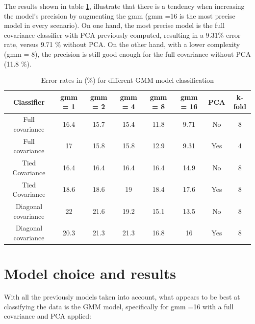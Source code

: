 \documentclass[twoside,a4paper,12pt]{report}
\begin{document}
The results shown in table \ref{errorRatesGMMs}, illustrate that there is a tendency 
when increasing the model's precision by augmenting the gmm (gmm =16 is the most precise model
in every scenario). On one hand, the most precise model is the full covariance classifier with PCA previously computed,
resulting in a 9.31\% error rate, versus 9.71 \% without PCA. On the other hand, with a lower complexity (gmm = 8),
the precision is still good enough for the full covariance without PCA (11.8 \%).


\begin{table}[H]
    \centering
     \begin{tabular}{||c c c c c c c c||} 
        \hline \hline
        Classifier & gmm = 1 & gmm = 2 & gmm = 4 & gmm = 8 &gmm = 16 & PCA & k-fold\\
        \hline\hline
        Full covariance &  16.4 &  15.7 &  15.4 & \cellcolor{blue!25}  11.8 & \cellcolor{blue!25} 9.71 & No & 8  \\ 
        \hline
        Full covariance &  17 &  15.8 &  15.8 &  12.9 & \cellcolor{blue!25} 9.31 & Yes & 4  \\ 
        \hline
        Tied Covariance &  16.4 &  16.4 & 16.4 &  16.4 & 14.9  & No & 8  \\
        \hline
        Tied Covariance &  18.6 &  18.6 & 19 &  18.4 & 17.6  & Yes & 8  \\
        \hline
        Diagonal covariance  &  22 &  21.6 & 19.2 &  15.1 & 13.5  & No & 8 \\
        \hline
        Diagonal covariance &20.3 &  21.3 & 21.3&  16.8  & 16 & Yes & 8\\
        \hline \hline
    \end{tabular}
    \caption{Error rates in (\%) for different GMM model classification    \label{errorRatesGMMs}    }
\end{table}

    

\section{Model choice and results}
With all the previously models taken into account, what appears to be best at
classifying the data is the GMM model, specifically for gmm =16 with a full covariance
and PCA applied:
\end{document}
